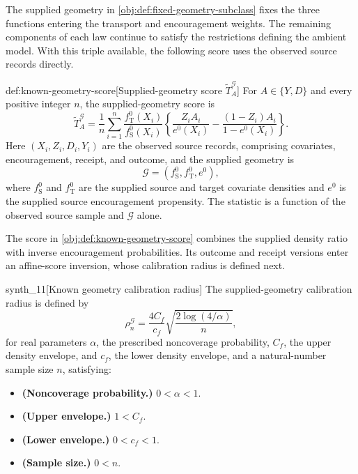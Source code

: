 The supplied geometry  in \cref{obj:def:fixed-geometry-subclass} fixes the three functions entering the transport and encouragement weights. The remaining components of each law continue to satisfy the restrictions defining the ambient model. With this triple available, the following score uses the observed source records directly.

\begin{definitionv}{def:known-geometry-score}[Supplied-geometry score $\widetilde T_A^{\mathcal G}$]
For \(A\in\{Y,D\}\) and every positive integer \(n\), the supplied-geometry score is
\[
\widetilde T_A^{\mathcal G}
=
\frac1n\sum_{i=1}^n
\frac{f_{\mathrm T}^0(X_i)}{f_{\mathrm S}^0(X_i)}
\left\{
\frac{Z_iA_i}{e^0(X_i)}
-
\frac{(1-Z_i)A_i}{1-e^0(X_i)}
\right\}.
\]
Here \((X_i,Z_i,D_i,Y_i)\) are the observed source records, comprising covariates, encouragement, receipt, and outcome, and the supplied geometry is
\[
\mathcal G=(f_{\mathrm S}^0,f_{\mathrm T}^0,e^0),
\]
where \(f_{\mathrm S}^0\) and \(f_{\mathrm T}^0\) are the supplied source and target covariate densities and \(e^0\) is the supplied source encouragement propensity. The statistic is a function of the observed source sample and \(\mathcal G\) alone.
\end{definitionv}

The score  in \cref{obj:def:known-geometry-score} combines the supplied density ratio with inverse encouragement probabilities. Its outcome and receipt versions enter an affine-score inversion, whose calibration radius is defined next.

\begin{definitionv}{synth_11}[Known geometry calibration radius]
The supplied-geometry calibration radius is defined by
\[
\rho_n^{\mathcal G}
=
\frac{4C_f}{c_f}
\sqrt{\frac{2\log(4/\alpha)}{n}},
\]
for real parameters \(\alpha\), the prescribed noncoverage probability, \(C_f\), the upper density envelope, and \(c_f\), the lower density envelope, and a natural-number sample size \(n\), satisfying:
\begin{itemize}
\item \textbf{(Noncoverage probability.)} \(0<\alpha<1\).
\item \textbf{(Upper envelope.)} \(1<C_f\).
\item \textbf{(Lower envelope.)} \(0<c_f<1\).
\item \textbf{(Sample size.)} \(0<n\).
\end{itemize}
\end{definitionv}

